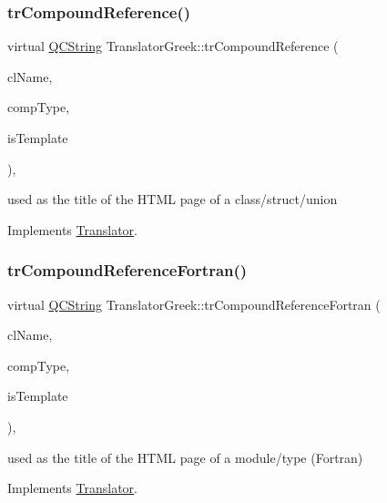 \subsubsection{\texorpdfstring{trCompoundReference()}{trCompoundReference()}}
{\footnotesize\ttfamily virtual \mbox{\hyperlink{class_q_c_string}{Q\+C\+String}} Translator\+Greek\+::tr\+Compound\+Reference (\begin{DoxyParamCaption}\item[{const char $\ast$}]{cl\+Name,  }\item[{\mbox{\hyperlink{class_class_def_ae70cf86d35fe954a94c566fbcfc87939}{Class\+Def\+::\+Compound\+Type}}}]{comp\+Type,  }\item[{bool}]{is\+Template }\end{DoxyParamCaption})\hspace{0.3cm}{\ttfamily [inline]}, {\ttfamily [virtual]}}

used as the title of the H\+T\+ML page of a class/struct/union 

Implements \mbox{\hyperlink{class_translator}{Translator}}.

\mbox{\label{class_translator_greek_a6b5f3f675c0c1438d8727227f621e071}} 
\subsubsection{\texorpdfstring{trCompoundReferenceFortran()}{trCompoundReferenceFortran()}}
{\footnotesize\ttfamily virtual \mbox{\hyperlink{class_q_c_string}{Q\+C\+String}} Translator\+Greek\+::tr\+Compound\+Reference\+Fortran (\begin{DoxyParamCaption}\item[{const char $\ast$}]{cl\+Name,  }\item[{\mbox{\hyperlink{class_class_def_ae70cf86d35fe954a94c566fbcfc87939}{Class\+Def\+::\+Compound\+Type}}}]{comp\+Type,  }\item[{bool}]{is\+Template }\end{DoxyParamCaption})\hspace{0.3cm}{\ttfamily [inline]}, {\ttfamily [virtual]}}

used as the title of the H\+T\+ML page of a module/type (Fortran) 

Implements \mbox{\hyperlink{class_translator}{Translator}}.

